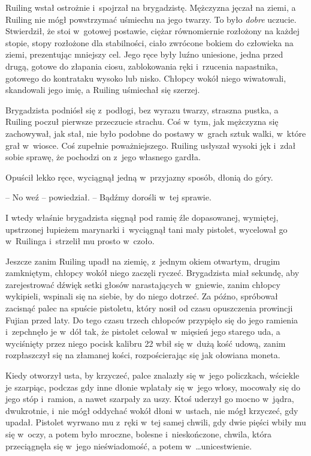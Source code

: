 \documentclass[oneside,polish,11pt,rmheadings]{mwbk}
\begin{document}
Ruiling wstał ostrożnie i~spojrzał na brygadzistę. Mężczyzna jęczał na ziemi, a Ruiling nie mógł powstrzymać uśmiechu na jego twarzy. To było \textit{dobre }uczucie. Stwierdził, że stoi w~gotowej postawie, ciężar równomiernie rozłożony na każdej stopie, stopy rozłożone dla stabilności, ciało zwrócone bokiem do człowieka na ziemi, prezentując mniejszy cel. Jego ręce były luźno uniesione, jedna przed drugą, gotowe do złapania ciosu, zablokowania ręki i~rzucenia napastnika, gotowego do kontrataku wysoko lub nisko. Chłopcy wokół niego wiwatowali, skandowali jego imię, a Ruiling uśmiechał się szerzej.

Brygadzista podniósł się z~podłogi, bez wyrazu twarzy, straszna pustka, a Ruiling poczuł pierwsze przeczucie strachu. Coś w~tym, jak mężczyzna się zachowywał, jak stał, nie było podobne do postawy w~grach sztuk walki, w~które grał w~wiosce. Coś zupełnie poważniejszego. Ruiling usłyszał wysoki jęk i~zdał sobie sprawę, że pochodzi on z~jego własnego gardła.

Opuścił lekko ręce, wyciągnął jedną w~przyjazny sposób, dłonią do góry. 

-- No weź -- powiedział. -- Bądźmy dorośli w~tej sprawie.

I wtedy właśnie brygadzista sięgnął pod ramię źle dopasowanej, wymiętej, upstrzonej łupieżem marynarki i~wyciągnął tani mały pistolet, wycelował go w~Ruilinga i~strzelił mu prosto w~czoło.

Jeszcze zanim Ruiling upadł na ziemię, z~jednym okiem otwartym, drugim zamkniętym, chłopcy wokół niego zaczęli ryczeć. Brygadzista miał sekundę, aby zarejestrować dźwięk setki głosów narastających w~gniewie, zanim chłopcy wykipieli, wspinali się na siebie, by do niego dotrzeć. Za późno, spróbował zacisnąć palec na spuście pistoletu, który nosił od czasu opuszczenia prowincji Fujian przed laty. Do tego czasu trzech chłopców przypięło się do jego ramienia i~zepchnęło je w~dół tak, że pistolet celował w~mięsień jego starego uda, a wyciśnięty przez niego pocisk kalibru 22 wbił się w~dużą kość udową, zanim rozpłaszczył się na złamanej kości, rozpościerając się jak ołowiana moneta.

Kiedy otworzył usta, by krzyczeć, palce znalazły się w~jego policzkach, wściekle je szarpiąc, podczas gdy inne dłonie wplatały się w~jego włosy, mocowały się do jego stóp i~ramion, a nawet szarpały za uszy. Ktoś uderzył go mocno w~jądra, dwukrotnie, i~nie mógł oddychać wokół dłoni w~ustach, nie mógł krzyczeć, gdy upadał. Pistolet wyrwano mu z~ręki w~tej samej chwili, gdy dwie pięści wbiły mu się w~oczy, a potem było mroczne, bolesne i~nieskończone, chwila, która przeciągnęła się w~jego nieświadomość, a potem w~\ldots  unicestwienie.
\end{document}
